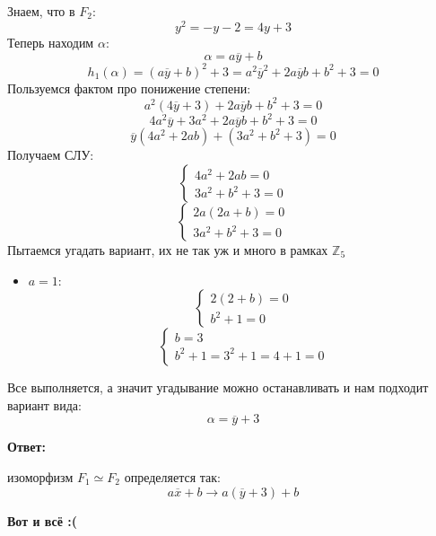 \documentclass[a4paper,12pt]{article}
\begin{document}
Знаем, что в $F_2$:
\[
y^2 = -y - 2 = 4y + 3
\]
Теперь находим $\alpha$:
\[
\alpha = a\overline{y} + b
\]
\[
h_1(\alpha) = (a\overline{y}+b)^2 + 3 = a^2\overline{y}^2 + 2 a\overline{y}b + b^2 + 3= 0
\]
Пользуемся фактом про понижение степени:
\[
a^2(4\overline{y}+ 3) +  2a \overline{y}b + b^2 + 3 = 0
\]
\[
4a^2\overline{y} + 3a^2 + 2a \overline{y}b + b^2 + 3 = 0
\]
\[
\overline{y} (4a^2 + 2ab) + (3a^2 + b^2 + 3) = 0
\]
Получаем СЛУ:
\[
\begin{cases}
4a^2 + 2ab = 0 \\3a^2 + b^2 + 3 = 0
\end{cases}
\]
\[
\begin{cases}
2a(2a  + b) = 0 \\3a^2 + b^2 + 3 = 0
\end{cases}
\]
Пытаемся угадать вариант, их не так уж и много в рамках $\mathbb{Z}_5$
\begin{itemize}
\item $a = 1 $:
\[
\begin{cases}
2(2 + b) = 0  \\ 
b^2 + 1 = 0 
\end{cases}
\]
\[
\begin{cases}
b = 3  \\ 
b^2 + 1 = 3^2 + 1 = 4 + 1 = 0 
\end{cases}
\]
\end{itemize}
Все выполняется, а значит угадывание можно останавливать и нам подходит вариант вида:
\[
\alpha = \overline{y} + 3
\]
\begin{center}
\textbf{Ответ: } 

изоморфизм $F_1 \simeq F_2$ определяется так:
\[
a\overline{x} + b \rightarrow a(\overline{y} + 3) + b
\]

\begin{center}
\textbf{Вот и всё :(}
\end{center}
\end{center}
 
\end{document}
